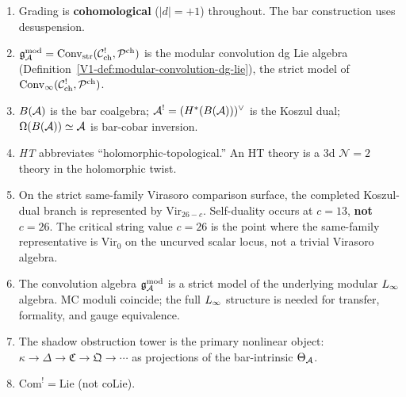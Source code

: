 \begin{enumerate}[label=\textup{(\alph*)}]
\item Grading is \textbf{cohomological} ($|d| = +1$) throughout.
 The bar construction uses desuspension.

\item $\mathfrak{g}_{\mathcal{A}}^{\mathrm{mod}} = \operatorname{Conv}_{\mathrm{str}}(\mathcal{C}^!_{\mathrm{ch}},
 \mathcal{P}^{\mathrm{ch}})$ is the modular convolution dg Lie
 algebra (Definition~\ref*{V1-def:modular-convolution-dg-lie}), the
 strict model of $\operatorname{Conv}_{\infty}(\mathcal{C}^!_{\mathrm{ch}},
 \mathcal{P}^{\mathrm{ch}})$.

\item $B(\mathcal{A})$ is the bar coalgebra; $\mathcal{A}^! = (H^*(B(\mathcal{A})))^\vee$
 is the Koszul dual; $\Omega(B(\mathcal{A})) \simeq \mathcal{A}$ is bar-cobar inversion.

\item \emph{HT} abbreviates ``holomorphic-topological.''
 An HT theory is a 3d $\mathcal{N} = 2$ theory in the holomorphic twist.

\item On the strict same-family Virasoro comparison surface, the
 completed Koszul-dual branch is represented by
 $\mathrm{Vir}_{26-c}$. Self-duality occurs at
 $c = 13$, \textbf{not} $c = 26$. The critical string value $c = 26$ is
 the point where the same-family representative is $\mathrm{Vir}_0$
 on the uncurved scalar locus, not a trivial Virasoro algebra.

\item The convolution algebra $\mathfrak{g}_{\mathcal{A}}^{\mathrm{mod}}$ is a strict model of the
 underlying modular $L_\infty$ algebra. MC moduli coincide; the full
 $L_\infty$ structure is needed for transfer, formality, and gauge
 equivalence.

\item The shadow obstruction tower is the primary nonlinear object:
 $\kappa \to \Delta \to \mathfrak{C} \to \mathfrak{Q} \to \cdots$
 as projections of the bar-intrinsic $\Theta_{\mathcal{A}}$.

\item $\mathrm{Com}^! = \mathrm{Lie}$ (not $\mathrm{coLie}$).
\end{enumerate}














